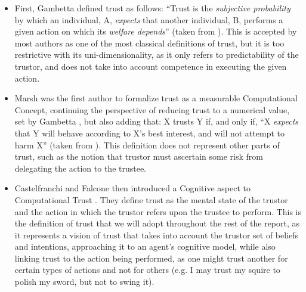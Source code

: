 \begin{itemize}
    \item First, Gambetta \cite{Gambetta1988} defined trust as follows: ``Trust is the \textit{subjective probability} by which an individual, A, \textit{expects} that another individual, B, performs a given action on which its \textit{welfare depends}'' (taken from \cite{Castelfranchi2010}). This is accepted by most authors as one of the most classical definitions of trust, but it is too restrictive with its uni-dimensionality, as it only refers to predictability of the trustor, and does not take into account competence in executing the given action.
    
    \item Marsh \cite{Marsh1994} was the first author to formalize trust as a measurable Computational Concept, continuing the perspective of reducing trust to a numerical value, set by Gambetta \cite{Gambetta1988}, but also adding that: X trusts Y if, and only if, ``X \textit{expects} that Y will behave according to X's best interest, and will not attempt to harm X'' (taken from \cite{Castelfranchi2010}). This definition does not represent other parts of trust, such as the notion that trustor must ascertain some risk from delegating the action to the trustee.
    
    \item Castelfranchi and Falcone then introduced a Cognitive aspect to Computational Trust \cite{Castelfranchi1998}. They define trust as the mental state of the trustor and the action in which the trustor refers upon the trustee to perform. This is the definition of trust that we will adopt throughout the rest of the report, as it represents a vision of trust that takes into account the trustor set of beliefs and intentions, approaching it to an agent's cognitive model, while also linking trust to the action being performed, as one might trust another for certain types of actions and not for others (e.g. I may trust my squire to polish my sword, but not to swing it).
\end{itemize}

